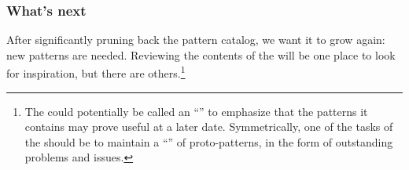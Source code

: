 \subsubsection*{What's next} After significantly pruning back the pattern catalog, we want it to grow again: new patterns are needed.  Reviewing the contents of the  will be one place to look for inspiration, but there are others.\footnote{The  could potentially be called an ``'' to emphasize that the patterns it contains may prove useful at a later date.  Symmetrically, one of the tasks of the  should be to maintain a ``'' of proto-patterns, in the form of outstanding problems and issues.}
